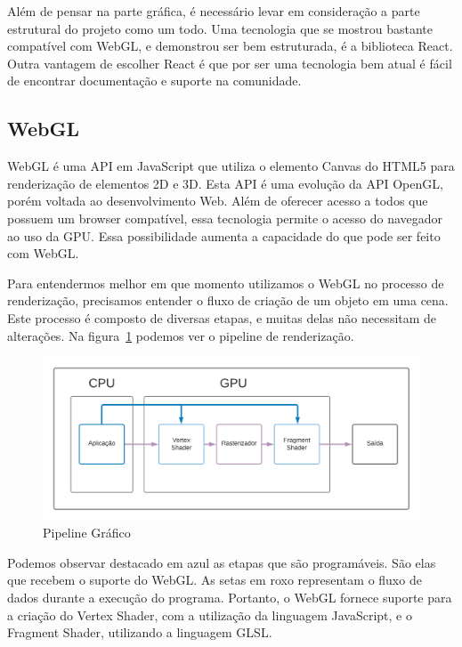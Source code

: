 \documentclass[tcc,capa]{texufpel}
\begin{document}
Além de pensar na parte gráfica, é necessário levar em consideração a parte estrutural do projeto como um todo. Uma tecnologia que se mostrou bastante compatível com WebGL, e demonstrou ser bem estruturada, é a biblioteca React. Outra vantagem de escolher React é que por ser uma tecnologia bem atual é fácil de encontrar documentação e suporte na comunidade.

\subsection{WebGL}

WebGL é uma API em JavaScript que utiliza o elemento Canvas do HTML5 para renderização de elementos 2D e 3D. Esta API é uma evolução da API OpenGL, porém voltada ao desenvolvimento Web. Além de oferecer acesso a todos que possuem um browser compatível, essa tecnologia permite o acesso do navegador ao uso da GPU. Essa possibilidade aumenta a capacidade do que pode ser feito com WebGL.

Para entendermos melhor em que momento utilizamos o WebGL no processo de renderização, precisamos entender o fluxo de criação de um objeto em uma cena. Este processo é composto de diversas etapas, e muitas delas não necessitam de alterações. Na figura~\ref{pipeline_grafico} podemos ver o pipeline de renderização.

\begin{figure}[htbp]
  \centering \includegraphics[scale=.7]{pipeline_grafico}
  \caption{Pipeline Gráfico}
  \label{pipeline_grafico}
\end{figure}%

Podemos observar destacado em azul as etapas que são programáveis. São elas que recebem o suporte do WebGL. As setas em roxo representam o fluxo de dados durante a execução do programa. Portanto, o WebGL fornece suporte para a criação do Vertex Shader, com a utilização da linguagem JavaScript, e o Fragment Shader, utilizando a linguagem GLSL. 
\end{document}
